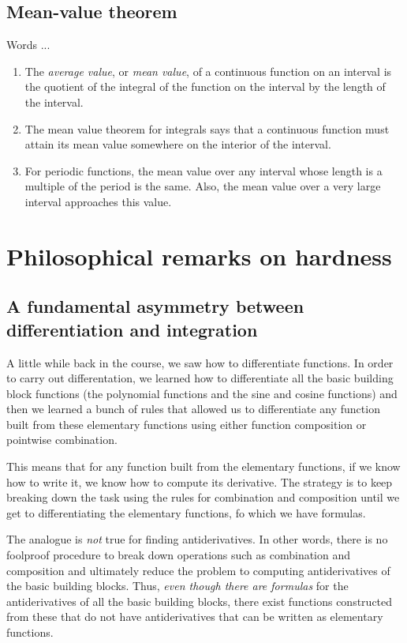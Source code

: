 \documentclass{amsart}
\begin{document}
\subsection{Mean-value theorem}

Words ...

\begin{enumerate}
\item The {\em average value}, or {\em mean value}, of a continuous
  function on an interval is the quotient of the integral of the
  function on the interval by the length of the interval.
\item The mean value theorem for integrals says that a continuous
  function must attain its mean value somewhere on the interior of the
  interval.
\item For periodic functions, the mean value over any interval whose
  length is a multiple of the period is the same. Also, the mean value
  over a very large interval approaches this value.
\end{enumerate}


\section{Philosophical remarks on hardness}

\subsection{A fundamental asymmetry between differentiation and integration}

A little while back in the course, we saw how to differentiate
functions. In order to carry out differentation, we learned how to
differentiate all the basic building block functions (the polynomial
functions and the sine and cosine functions) and then we learned a
bunch of rules that allowed us to differentiate any function built
from these elementary functions using either function composition or
pointwise combination.

This means that for any function built from the elementary functions,
if we know how to write it, we know how to compute its derivative. The
strategy is to keep breaking down the task using the rules for
combination and composition until we get to differentiating the
elementary functions, fo which we have formulas.

The analogue is {\em not} true for finding antiderivatives. In other
words, there is no foolproof procedure to break down operations such
as combination and composition and ultimately reduce the problem to
computing antiderivatives of the basic building blocks. Thus, {\em
even though there are formulas} for the antiderivatives of all the
basic building blocks, there exist functions constructed from these
that do not have antiderivatives that can be written as elementary
functions.
\end{document}
